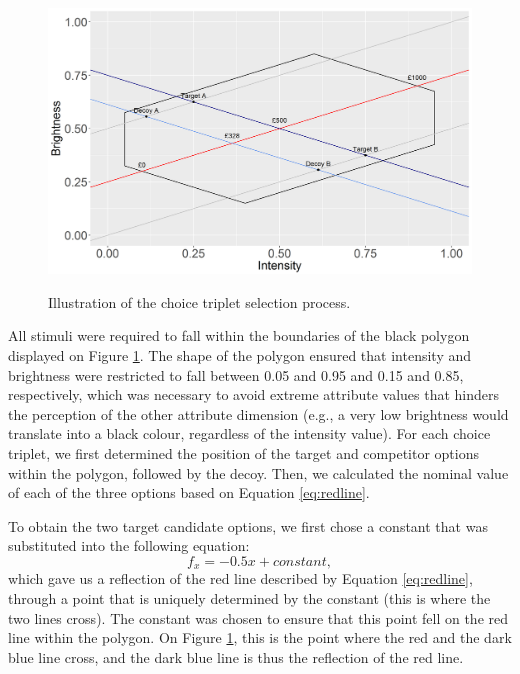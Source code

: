 \documentclass[11pt,a4paper]{article}
\begin{document}
\begin{figure}
\centering
\caption{Illustration of the choice triplet selection process.}
\includegraphics[width=1\textwidth]{Figure_1poly.png}
\label{fig:explain}
\end{figure}


All stimuli were required to fall within the boundaries of the black polygon displayed on Figure \ref{fig:explain}. The shape of the polygon ensured that intensity and brightness were restricted to fall between 0.05 and 0.95 and 0.15 and 0.85, respectively, which was necessary to avoid extreme attribute values that hinders the perception of the other attribute dimension (e.g., a very low brightness would translate into a black colour, regardless of the intensity value). For each choice triplet, we first determined the position of the target and competitor options within the polygon, followed by the decoy. Then, we calculated the nominal value of each of the three options based on Equation \ref{eq:redline}.

 To obtain the two target candidate options, we first chose a constant that was substituted into the following equation:
\begin{equation} \label{eq:blueline}
 f_{x} = -0.5x + constant,
\end{equation}
which gave us a reflection of the red line described by Equation \ref{eq:redline}, through a point that is uniquely determined by the constant (this is where the two lines cross). The constant was chosen to ensure that this point fell on the red line within the polygon. On Figure \ref{fig:explain}, this is the point where the red and the dark blue line cross, and the dark blue line is thus the reflection of the red line.
\end{document}
